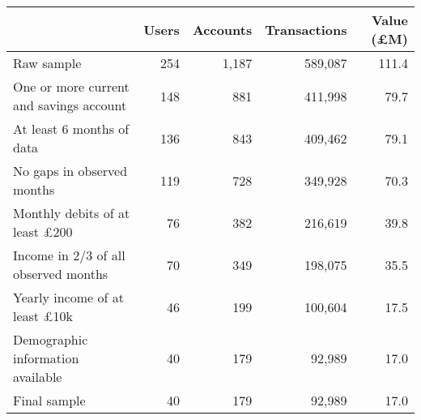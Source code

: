\begin{tabular}{lrrrr}
\toprule
                                        & Users & Accounts & Transactions & Value (\pounds M) \\
\midrule
                             Raw sample &   254 &    1,187 &      589,087 &             111.4 \\
One or more current and savings account &   148 &      881 &      411,998 &              79.7 \\
              At least 6 months of data &   136 &      843 &      409,462 &              79.1 \\
             No gaps in observed months &   119 &      728 &      349,928 &              70.3 \\
  Monthly debits of at least \pounds200 &    76 &      382 &      216,619 &              39.8 \\
   Income in 2/3 of all observed months &    70 &      349 &      198,075 &              35.5 \\
   Yearly income of at least \pounds10k &    46 &      199 &      100,604 &              17.5 \\
      Demographic information available &    40 &      179 &       92,989 &              17.0 \\
                           Final sample &    40 &      179 &       92,989 &              17.0 \\
\bottomrule
\end{tabular}
